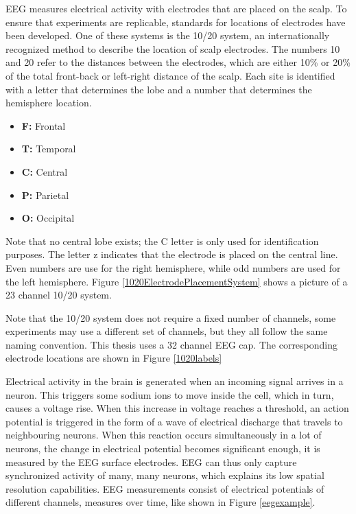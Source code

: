EEG measures electrical activity with electrodes that are placed on the scalp. To ensure that experiments are replicable, standards for locations of electrodes have been developed. One of these systems is the 10/20 system, an internationally recognized method to describe the location of scalp electrodes\cite{TenTwentyManual}. The numbers 10 and 20 refer to the distances between the electrodes, which are either 10\% or 20\% of the total front-back or left-right distance of the scalp. Each site is identified with a letter that determines the lobe and a number that determines the hemisphere location.
\begin{itemize}
\item \textbf{F:} Frontal
\item \textbf{T:} Temporal
\item \textbf{C:} Central
\item \textbf{P:} Parietal
\item \textbf{O:} Occipital
\end{itemize}
Note that no central lobe exists; the C letter is only used for identification purposes. The letter z indicates that the electrode is placed on the central line. Even numbers are use for the right hemisphere, while odd numbers are used for the left hemisphere. Figure \ref{1020ElectrodePlacementSystem} shows a picture of a 23 channel 10/20 system.


Note that the 10/20 system does not require a fixed number of channels, some experiments may use a different set of channels, but they all follow the same naming convention. This thesis uses a 32 channel EEG cap. The corresponding electrode locations are shown in Figure \ref{1020labels}



Electrical activity in the brain is generated when an incoming signal arrives in a neuron. This triggers some sodium ions to move inside the cell, which in turn, causes a voltage rise\cite{ExtendedPaper}. When this increase in voltage reaches a threshold, an action potential is triggered in the form of a wave of electrical discharge that travels to neighbouring neurons. When this reaction occurs simultaneously in a lot of neurons, the change in electrical potential becomes significant enough, it is measured by the EEG surface electrodes. EEG can thus only capture synchronized activity of many, many neurons\cite{ExtendedPaper}, which explains its low spatial resolution capabilities. EEG measurements consist of electrical potentials of different channels, measures over time, like shown in Figure \ref{eegexample}.

